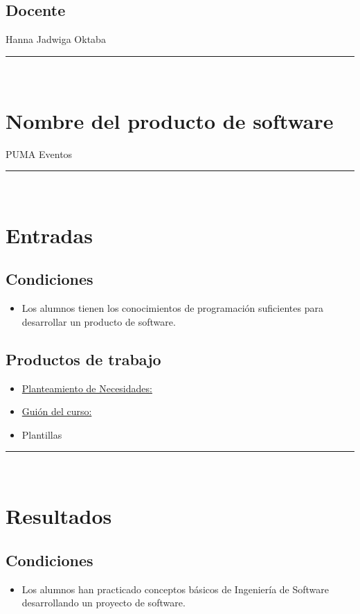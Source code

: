 \documentclass{article}
\begin{document}
\subsection*{Docente} Hanna Jadwiga Oktaba\\
\rule{0.8\textwidth}{.8pt}\\

\section*{Nombre del producto de software}
PUMA Eventos\\
\rule{0.8\textwidth}{.8pt}\\

\section*{Entradas}
\subsection*{Condiciones}
\begin{itemize}
\item Los alumnos tienen los conocimientos de programación suficientes para
  desarrollar un producto de software.
\end{itemize}
\subsection*{Productos de trabajo}
\begin{itemize}
\item \href{https://drive.google.com/open?id=18vx7IkGuZTE9kcgVFnWUrrSildkzyM8Y}{Planteamiento de Necesidades:}
\item \href{https://drive.google.com/open?id=1V-6SAoTrtV-phCGOPW19JJ2T-uBJpByW}{Guión del curso:}
\item Plantillas
\end{itemize}

\rule{0.8\textwidth}{.8pt}\\

\section*{Resultados}
\subsection*{Condiciones}
\begin{itemize}
\item Los alumnos han practicado conceptos básicos de Ingeniería de Software
  desarrollando un proyecto de software.
\end{itemize}
\end{document}
